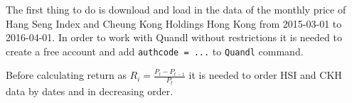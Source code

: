 The first thing to do is download and load in the data of the monthly
price of Hang Seng Index and Cheung Kong Holdings Hong Kong from
2015-03-01 to 2016-04-01. In order to work with Quandl without
restrictions it is needed to create a free account and add
\texttt{authcode\ =\ ...} to \texttt{Quandl} command.

\begin{Shaded}
\begin{Highlighting}[]

\StringTok{ }\NormalTok{(}\NormalTok{, }\NormalTok{, }
\StringTok{           }\NormalTok{,}\NormalTok{, } \NormalTok{, }
\StringTok{           }\NormalTok{)}

\StringTok{ }\NormalTok{(}\NormalTok{, }\NormalTok{, }
\StringTok{           }\NormalTok{, }\NormalTok{, } \NormalTok{, }
\StringTok{           }\NormalTok{)}

\NormalTok{); }\NormalTok{)}
\end{Highlighting}
\end{Shaded}

Before calculating return as
\(R_i = \displaystyle \frac{P_t - P_{t-1}}{P_t}\) it is needed to order
HSI and CKH data by dates and in decreasing order.

\begin{Shaded}
\begin{Highlighting}[]
\StringTok{ }\NormalTok{(}\NormalTok{)}
\NormalTok{(hsi.df)[}\NormalTok{] <-}
\StringTok{ }\NormalTok{hsi.df[}\NormalTok{(}\NormalTok{(hsi.df$Date)),]}
\end{Highlighting}
\end{Shaded}

